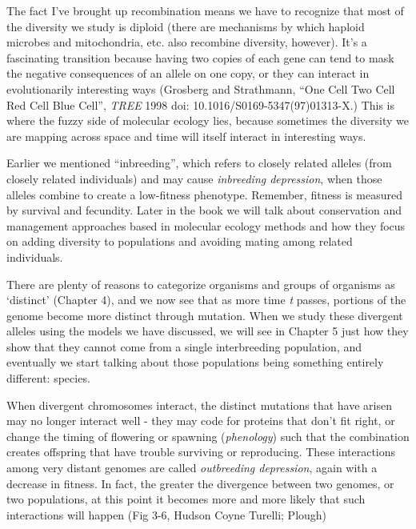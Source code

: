 \documentclass[
]{article}
\begin{document}
The fact I've brought up recombination means we have to recognize that
most of the diversity we study is diploid (there are mechanisms by which
haploid microbes and mitochondria, etc. also recombine diversity,
however). It's a fascinating transition because having two copies of
each gene can tend to mask the negative consequences of an allele on one
copy, or they can interact in evolutionarily interesting ways (Grosberg
and Strathmann, ``One Cell Two Cell Red Cell Blue Cell'', \emph{TREE}
1998 doi: 10.1016/S0169-5347(97)01313-X.) This is where the fuzzy side
of molecular ecology lies, because sometimes the diversity we are
mapping across space and time will itself interact in interesting ways.

Earlier we mentioned ``inbreeding'', which refers to closely related
alleles (from closely related individuals) and may cause
\emph{inbreeding depression}, when those alleles combine to create a
low-fitness phenotype. Remember, fitness is measured by survival and
fecundity. Later in the book we will talk about conservation and
management approaches based in molecular ecology methods and how they
focus on adding diversity to populations and avoiding mating among
related individuals.

There are plenty of reasons to categorize organisms and groups of
organisms as `distinct' (Chapter 4), and we now see that as more time
\emph{t} passes, portions of the genome become more distinct through
mutation. When we study these divergent alleles using the models we have
discussed, we will see in Chapter 5 just how they show that they cannot
come from a single interbreeding population, and eventually we start
talking about those populations being something entirely different:
species.

When divergent chromosomes interact, the distinct mutations that have
arisen may no longer interact well - they may code for proteins that
don't fit right, or change the timing of flowering or spawning
(\emph{phenology}) such that the combination creates offspring that have
trouble surviving or reproducing. These interactions among very distant
genomes are called \emph{outbreeding depression}, again with a decrease
in fitness. In fact, the greater the divergence between two genomes, or
two populations, at this point it becomes more and more likely that such
interactions will happen (Fig 3-6, Hudson Coyne Turelli; Plough)
\end{document}
